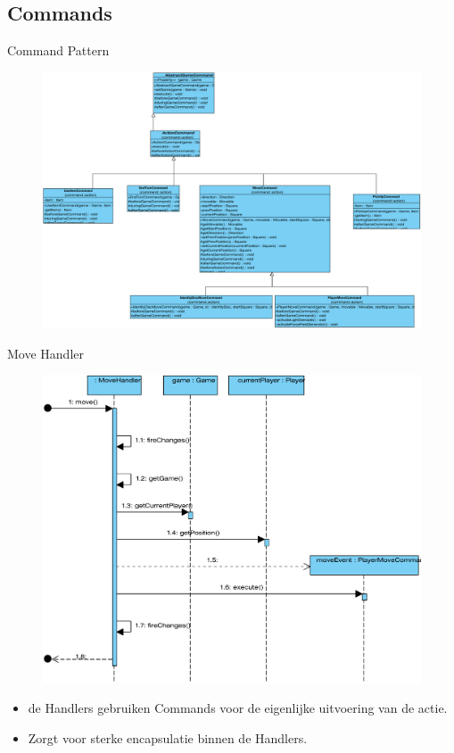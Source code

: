 \documentclass[t]{beamer}
\begin{document}
\subsection{Commands}
\begin{frame}{Command Pattern}
\begin{figure}
	\center
	\includegraphics[width= 0.8\linewidth]{img/Command_pattern.pdf}
\end{figure}	
\end{frame}


\begin{frame}{Move Handler}
\begin{multicols}{2}
\begin{minipage}{\columnwidth}
\begin{figure}
	\center
	\includegraphics[width=\linewidth]{img/movehandler}
\end{figure}
\end{minipage}
\begin{minipage}{\columnwidth}
\begin{itemize}
	\item de Handlers gebruiken Commands voor de eigenlijke uitvoering van de actie.
	\item Zorgt voor sterke encapsulatie binnen de Handlers.
\end{itemize}
\end{minipage}
\end{multicols}
\end{frame}
\end{document}
